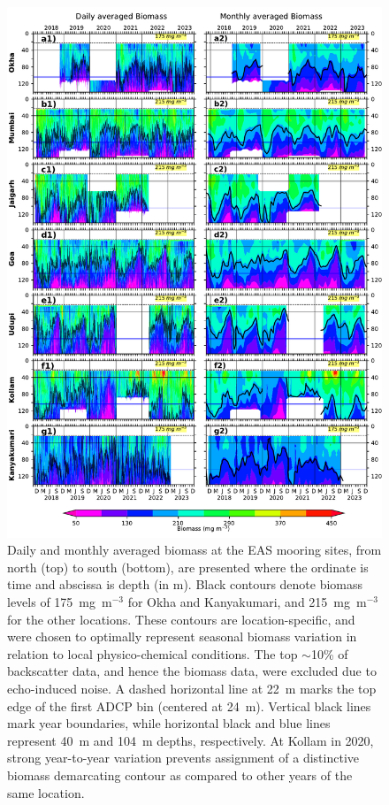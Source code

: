 \documentclass[authoryear,review,11pt]{elsarticle}
\begin{document}
\begin{figure}[htbp]
	\centering
	\includegraphics[width=\textwidth]{./fig_03_biomass_daily_monthly.pdf} 
	\captionsetup{justification=justified,font=footnotesize,skip=0.05\baselineskip,width=\textwidth}
	\caption{Daily and monthly averaged biomass at the EAS mooring sites, from north (top) to south (bottom), are presented where the ordinate is time and abscissa is depth (in m). Black contours denote biomass levels of 175~mg~m$^{-3}$ for Okha and Kanyakumari, and 215~mg~m$^{-3}$ for the other locations. These contours are location-specific, and were chosen to optimally represent seasonal biomass variation in relation to local physico-chemical conditions. The top $\sim$10\% of backscatter data, and hence the biomass data, were excluded due to echo-induced noise. A dashed horizontal line at 22~m marks the top edge of the first ADCP bin (centered at 24~m). Vertical black lines mark year boundaries, while horizontal black and blue lines represent 40~m and 104~m depths, respectively. At Kollam in 2020, strong year-to-year variation prevents assignment of a distinctive biomass demarcating contour as compared to other years of the same location.}
	\label{fig:biomass_daily_monthly}
\end{figure}
\end{document}
